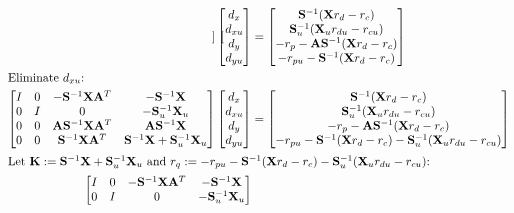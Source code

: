 \documentclass[10pt,a4paper]{article}
\begin{document}
\begin{align*}
\begin{bmatrix}
\end{bmatrix}
\begin{bmatrix}d_x \\ d_{xu} \\ d_y \\ d_{yu}\end{bmatrix} &= 
\begin{bmatrix}
\mathbf{S}^{-1}(\mathbf{X}r_d - r_c) \\
\mathbf{S}_u^{-1}(\mathbf{X}_ur_{du} - r_{cu}) \\
-r_p - \mathbf{A}\mathbf{S}^{-1}(\mathbf{X}r_d - r_c) \\
-r_{pu} - \mathbf{S}^{-1}(\mathbf{X}r_d - r_c)
\end{bmatrix} \\
\intertext{Eliminate $d_{xu}$:}
\begin{bmatrix}
I & 0 & -\mathbf{S}^{-1}\mathbf{X}\mathbf{A}^T & -\mathbf{S}^{-1}\mathbf{X} \\
0 & I & 0 & -\mathbf{S}_u^{-1}\mathbf{X}_u \\
0 & 0 & \mathbf{A}\mathbf{S}^{-1}\mathbf{X}\mathbf{A}^T & \mathbf{A}\mathbf{S}^{-1}\mathbf{X} \\
0 & 0 & \mathbf{S}^{-1}\mathbf{X}\mathbf{A}^T & \mathbf{S}^{-1}\mathbf{X}+\mathbf{S}_u^{-1}\mathbf{X}_u
\end{bmatrix}
\begin{bmatrix}d_x \\ d_{xu} \\ d_y \\ d_{yu}\end{bmatrix} &= 
\begin{bmatrix}
\mathbf{S}^{-1}(\mathbf{X}r_d - r_c) \\
\mathbf{S}_u^{-1}(\mathbf{X}_ur_{du} - r_{cu}) \\
-r_p - \mathbf{A}\mathbf{S}^{-1}(\mathbf{X}r_d - r_c) \\
-r_{pu} - \mathbf{S}^{-1}(\mathbf{X}r_d - r_c) - \mathbf{S}_u^{-1}(\mathbf{X}_ur_{du} - r_{cu})
\end{bmatrix} \\
\intertext{Let $\mathbf{K} := \mathbf{S}^{-1}\mathbf{X}+\mathbf{S}_u^{-1}\mathbf{X}_u$ and $r_q := -r_{pu} - \mathbf{S}^{-1}(\mathbf{X}r_d - r_c) - \mathbf{S}_u^{-1}(\mathbf{X}_ur_{du} - r_{cu})$:}
\begin{bmatrix}
I & 0 & -\mathbf{S}^{-1}\mathbf{X}\mathbf{A}^T & -\mathbf{S}^{-1}\mathbf{X} \\
0 & I & 0 & -\mathbf{S}_u^{-1}\mathbf{X}_u \\

\end{bmatrix}
\end{align*}
\end{document}
